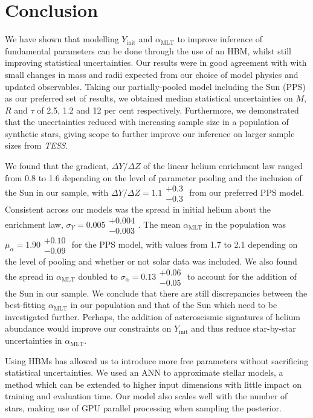 \documentclass[a4paper,fleqn,usenatbib]{mnras}
\newcommand{\mlt}{\ensuremath{{\alpha_\mathrm{MLT}}}}
\begin{document}
\section{Conclusion}


We have shown that modelling $Y_\mathrm{init}$ and $\mlt$ to improve inference of fundamental parameters can be done through the use of an HBM, whilst still improving statistical uncertainties. Our results were in good agreement with  with small changes in mass and radii expected from our choice of model physics and updated observables. Taking our partially-pooled model including the Sun (PPS) as our preferred set of results, we obtained median statistical uncertainties on $M$, $R$ and $\tau$ of 2.5, 1.2 and 12 per cent respectively. Furthermore, we demonstrated that the uncertainties reduced with increasing sample size in a population of synthetic stars, giving scope to further improve our inference on larger sample sizes from \emph{TESS}.

We found that the gradient, $\Delta Y / \Delta Z$ of the linear helium enrichment law ranged from 0.8 to 1.6 depending on the level of parameter pooling and the inclusion of the Sun in our sample, with $\Delta Y / \Delta Z = 1.1\substack{+0.3\\-0.3}$ from our preferred PPS model. Consistent across our models was the spread in initial helium about the enrichment law, $\sigma_Y = 0.005\substack{+0.004\\-0.003}$. The mean $\mlt$ in the population was $\mu_\alpha = 1.90\substack{+0.10\\-0.09}$ for the PPS model, with values from 1.7 to 2.1 depending on the level of pooling and whether or not solar data was included. We also found the spread in $\mlt$ doubled to $\sigma_\alpha = 0.13\substack{+0.06\\-0.05}$ to account for the addition of the Sun in our sample. We conclude that there are still discrepancies between the best-fitting $\mlt$ in our population and that of the Sun which need to be investigated further. Perhaps, the addition of asteroseismic signatures of helium abundance \citep[see e.g.][]{Verma.Raodeo.ea2017} would improve our constraints on $Y_\mathrm{init}$ and thus reduce star-by-star uncertainties in $\mlt$.

Using HBMs has allowed us to introduce more free parameters without sacrificing statistical uncertainties. We used an ANN to approximate stellar models, a method which can be extended to higher input dimensions with little impact on training and evaluation time. Our model also scales well with the number of stars, making use of GPU parallel processing when sampling the posterior.
\end{document}

